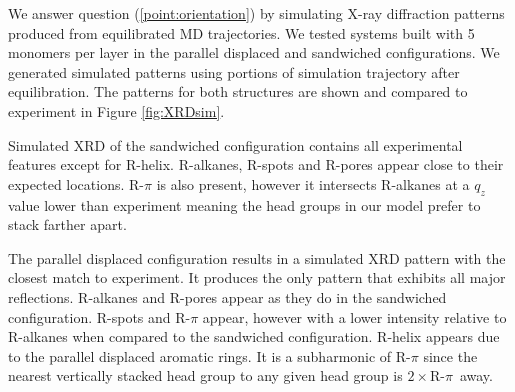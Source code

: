 \documentclass[journal=jpcbfk,manusciprt=article]{achemso}
\begin{document}
  We answer question (\ref{point:orientation}) by simulating X-ray diffraction
  patterns produced from equilibrated MD trajectories. We tested systems built
  with 5 monomers per layer in the parallel displaced and sandwiched
  configurations. We generated simulated patterns using portions of simulation
  trajectory after equilibration. The patterns for both structures are shown and
  compared to experiment in Figure \ref{fig:XRDsim}.

  Simulated XRD of the sandwiched configuration contains all experimental
  features except for R-helix. R-alkanes, R-spots and R-pores appear close to their
  expected locations. R-$\pi$ is also present, however it intersects R-alkanes at
  a $q_z$ value lower than experiment meaning the head groups in our model prefer 
  to stack farther apart. 

  The parallel displaced configuration results in a simulated XRD pattern with
  the closest match to experiment. It produces the only pattern that exhibits all
  major reflections. R-alkanes and R-pores appear as they do in the sandwiched
  configuration. R-spots and R-$\pi$ appear, however with a lower intensity
  relative to R-alkanes when compared to the sandwiched configuration. R-helix
  appears due to the parallel displaced aromatic rings. It is a subharmonic of
  R-$\pi$ since the nearest vertically stacked head group to any given head group
  is $2\times$R-$\pi$~away. 
\end{document}
